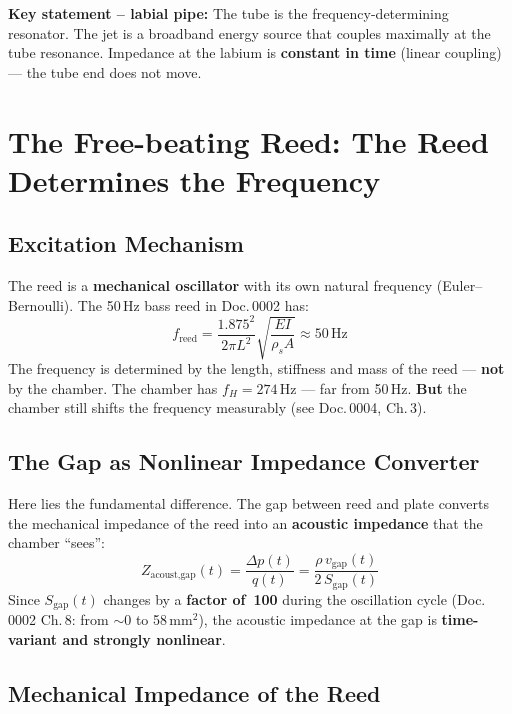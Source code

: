 \documentclass[11pt,a4paper]{article}
\begin{document}
\begin{keybox}
\textbf{Key statement -- labial pipe:} The tube is the frequency-determining resonator. The jet is a broadband energy source that couples maximally at the tube resonance. Impedance at the labium is \textbf{constant in time} (linear coupling) --- the tube end does not move.
\end{keybox}

\section{The Free-beating Reed: The Reed Determines the Frequency}

\subsection{Excitation Mechanism}

The reed is a \textbf{mechanical oscillator} with its own natural frequency (Euler--Bernoulli). The 50\,Hz bass reed in Doc.\,0002 has:
\begin{equation}
f_\text{reed} = \frac{1{.}875^2}{2\pi L^2} \sqrt{\frac{EI}{\rho_s A}} \approx 50\,\text{Hz}
\end{equation}
The frequency is determined by the length, stiffness and mass of the reed --- \textbf{not} by the chamber. The chamber has $f_H = 274$\,Hz --- far from 50\,Hz. \textbf{But} the chamber still shifts the frequency measurably (see Doc.\,0004, Ch.\,3).

\subsection{The Gap as Nonlinear Impedance Converter}

Here lies the fundamental difference. The gap between reed and plate converts the mechanical impedance of the reed into an \textbf{acoustic impedance} that the chamber ``sees'':
\begin{equation}
Z_\text{acoust,gap}(t) = \frac{\Delta p(t)}{q(t)} = \frac{\rho\, v_\text{gap}(t)}{2\, S_\text{gap}(t)}
\end{equation}
Since $S_\text{gap}(t)$ changes by a \textbf{factor of~100} during the oscillation cycle (Doc.\,0002 Ch.\,8: from $\sim 0$ to 58\,mm$^2$), the acoustic impedance at the gap is \textbf{time-variant and strongly nonlinear}.

\subsection{Mechanical Impedance of the Reed}
\end{document}
